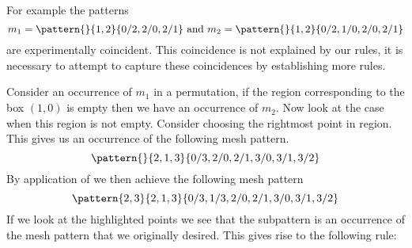 For example the patterns
\begin{equation*}
    m_1 = \pattern{}{1,2}{0/2,2/0,2/1} \text{ and } m_2 = \pattern{}{1,2}{0/2,1/0,2/0,2/1}
\end{equation*}
are experimentally coincident. This coincidence is not explained by our rules,
it is necessary to attempt to capture these coincidences by establishing more
rules.

Consider an occurrence of \(m_1\) in a permutation, if the region corresponding
to the box \((1,0)\) is empty then we have an occurrence of \(m_2\). Now look at
the case when this region is not empty. Consider choosing the rightmost point in
region.
This gives us an occurrence of the following mesh pattern.
\begin{equation*}
    \pattern{}{2,1,3}{0/3,2/0,2/1,3/0,3/1,3/2}
\end{equation*}
By application of  we then achieve the following
mesh pattern
\begin{equation*}
    \pattern{2,3}{2,1,3}{0/3,1/3,2/0,2/1,3/0,3/1,3/2}
\end{equation*}
If we look at the highlighted points we see that the subpattern is an occurrence
of the mesh pattern that we originally desired. This gives rise to the following
rule:

